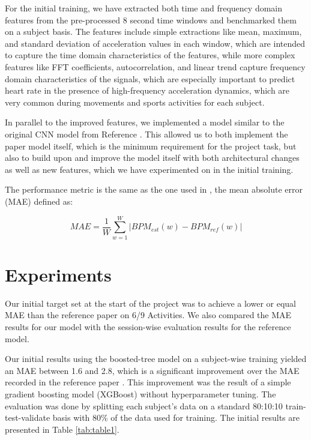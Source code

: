 \documentclass[12pt, conference]{IEEEtran}
\begin{document}
For the initial training, we have extracted both time and frequency domain features from the pre-processed 8 second time windows and benchmarked them on a subject basis. The features include simple extractions like mean, maximum, and standard deviation of acceleration values in each window, which are intended to capture the time domain characteristics of the features, while more complex features like FFT coefficients, autocorrelation, and linear trend capture frequency domain characteristics of the signals, which are especially important to predict heart rate in the presence of high-frequency acceleration dynamics, which are very common during movements and sports activities for each subject.

In parallel to the improved features, we implemented a model similar to the original CNN model from Reference \cite{reiss2019deep}. This allowed us to both implement the paper model itself, which is the minimum requirement for the project task, but also to build upon and improve the model itself with both architectural changes as well as new features, which we have experimented on in the initial training.

The performance metric is the same as the one used in \cite{reiss2019deep}, the mean absolute error (MAE) defined as:

\begin{equation}
	MAE=\frac{1}{W} \sum_{w=1}^{W} \lvert BPM_{est}(w)-BPM_{ref}(w) \rvert
\end{equation}

\section{Experiments}

Our initial target set at the start of the project was to achieve a lower or equal MAE than the reference paper \cite{reiss2019deep} on 6/9 Activities. We also compared the MAE results for our model with the session-wise evaluation results for the reference model.

Our initial results using the boosted-tree model on a subject-wise training yielded an MAE between 1.6 and 2.8, which is a significant improvement over the MAE recorded in the reference paper \cite{reiss2019deep}.  This improvement was the result of a simple gradient boosting model (XGBoost) without hyperparameter tuning. The evaluation was done by splitting each subject’s data on a standard 80:10:10 train-test-validate basis with 80\% of the data used for training. The initial results are presented in Table \ref{tab:table1}.
\end{document}

